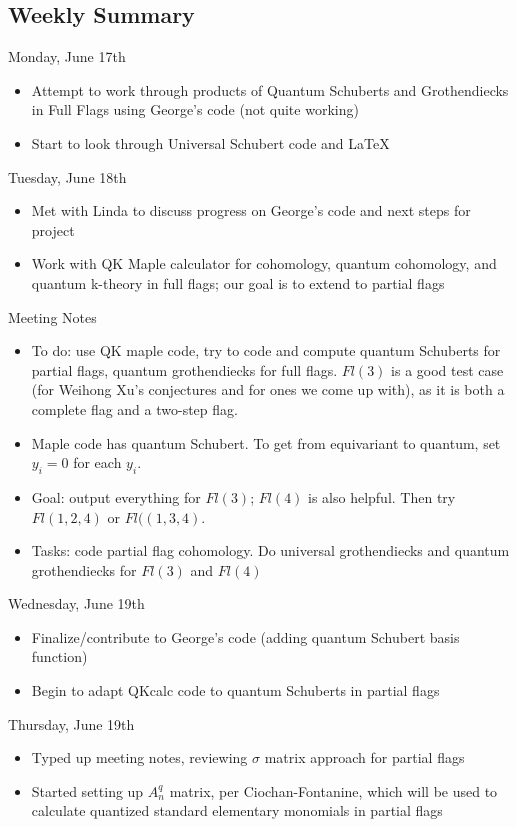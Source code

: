 \subsection{Weekly Summary}

Monday, June 17th
\begin{itemize}
    \item Attempt to work through products of Quantum Schuberts and Grothendiecks in Full Flags using George's code (not quite working)
    \item Start to look through Universal Schubert code and LaTeX
\end{itemize}

Tuesday, June 18th
\begin{itemize}
    \item Met with Linda to discuss progress on George's code and next steps for project
    \item Work with QK Maple calculator for cohomology, quantum cohomology, and quantum k-theory in full flags; our goal is to extend to partial flags
\end{itemize}

Meeting Notes
\begin{itemize}
    \item To do: use QK maple code, try to code and compute quantum Schuberts for partial flags, quantum grothendiecks for full flags. $Fl(3)$ is a good test case (for Weihong Xu's conjectures and for ones we come up with), as it is both a complete flag and a two-step flag. 
    \item Maple code has quantum Schubert. To get from equivariant to quantum, set $y_i = 0$ for each $y_i$.
    \item Goal: output everything for $Fl(3)$; $Fl(4)$ is also helpful. Then try $Fl(1,2,4)$ or $Fl((1,3,4)$.
    \item Tasks: code partial flag cohomology. Do universal grothendiecks and quantum grothendiecks for $Fl(3)$ and $Fl(4)$
\end{itemize}

Wednesday, June 19th
\begin{itemize}
    \item Finalize/contribute to George's code (adding quantum Schubert basis function)
    \item Begin to adapt QKcalc code to quantum Schuberts in partial flags
\end{itemize}

Thursday, June 19th
\begin{itemize}
    \item Typed up meeting notes, reviewing $\sigma$ matrix approach for partial flags 
    \item Started setting up $A_n^q$ matrix, per Ciochan-Fontanine, which will be used to calculate quantized standard elementary monomials in partial flags
\end{itemize}